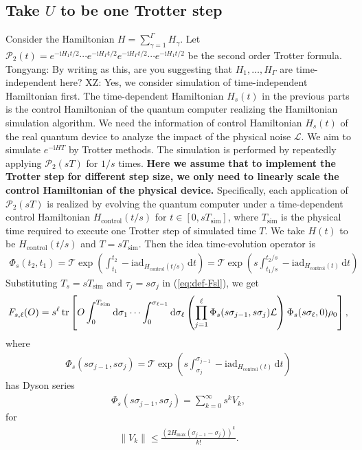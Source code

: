 \documentclass[11pt]{article}
\newcommand{\eq}[1]{(\ref{eq:#1})}
\renewcommand{\i}{\mathrm{i}}
\renewcommand{\d}{\mathrm{d}}
\renewcommand{\L}{\mathcal{L}}
\newcommand{\ad}{\mathrm{ad}}
\newcommand{\T}{\mathcal{T}}
\renewcommand{\P}{\mathcal{P}}
\newcommand{\simu}{\mathrm{sim}}
\newcommand{\Hc}{H_{\mathrm{control}}}
\newcommand{\xz}[1]{{\color{cyan} XZ: #1}}
\newcommand{\tyl}[1]{{\color{blue} Tongyang: #1}}
\begin{document}
\subsection{Take $U$ to be one Trotter step}
Consider the Hamiltonian $H = \sum_{\gamma=1}^{\Gamma} H_{\gamma}$. Let $\P_2(t)=e^{-\i H_1 t/2}\cdots e^{-\i H_{\Gamma} t/2} e^{-\i H_{\Gamma} t/2} \cdots e^{-\i H_1 t/2}$ be the second order Trotter formula. \tyl{By writing as this, are you suggesting that $H_{1},\ldots,H_{\Gamma}$ are time-independent here?} \xz{Yes, we consider simulation of time-independent Hamiltonian first. The time-dependent Hamiltonian $H_s(t)$ in the previous parts is the control Hamiltonian of the quantum computer realizing the Hamiltonian simulation algorithm. We need the information of control Hamiltonian $H_s(t)$ of the real quantum device to analyze the impact of the physical noise $\L$. } We aim to simulate $e^{-\i H T}$ by Trotter methods. The simulation is performed by repeatedly applying $\P_2(sT)$ for $1/s$ times. \textbf{Here we assume that to implement the Trotter step for different step size, we only need to linearly scale the control Hamiltonian of the physical device.} Specifically, each application of $\P_2(sT)$ is realized by evolving the quantum computer under a time-dependent control Hamiltonian $\Hc(t/s)$ for $t\in [0, sT_{\simu}]$, where $T_{\simu}$ is the physical time required to execute one Trotter step of simulated time $T$. We take $H(t)$ to be $\Hc(t/s)$ and $T = s T_{\simu}$. Then the idea time-evolution operator is 
\begin{align*}
    \Phi_s(t_2,t_1)=\T \exp(\int_{t_1}^{t_2} -\i\ad_{\Hc(t/s)}\,\d t) = \T \exp(s\int_{t_1/s}^{t_2/s} -\i\ad_{\Hc(t)}\,\d t) 
\end{align*} 
Substituting $T_s = sT_{\simu}$ and $\tau_j=s\sigma_j$ in \eq{def-Fsl}, we get \begin{align*}
    F_{s,\ell}(O)=s^\ell \tr\left[O \int_{0}^{T_{\simu}} \d\sigma_1 \cdots \int_{0}^{\sigma_{\ell-1}} \d\sigma_{\ell} \left( \prod_{j=1}^{\ell} \Phi_s(s\sigma_{j-1}, s\sigma_j) \L \right) \Phi_s(s\sigma_\ell, 0) \rho_0 \right],
\end{align*}
where \begin{align*}
    \Phi_s(s\sigma_{j-1}, s\sigma_j) = \T \exp(s\int_{\sigma_{j}}^{\sigma_{j-1}} -\i\ad_{\Hc(t)}\,\d t)
\end{align*}
has Dyson series \begin{align*}
    \Phi_s(s\sigma_{j-1}, s\sigma_j)=\sum_{k=0}^{\infty} s^k V_k,
\end{align*}
for \begin{align*}
    \left\|V_k\right\| \leq \frac{\left(2 H_{\max }\left(\sigma_{j-1}-\sigma_j\right)\right)^k}{k!}.
\end{align*}


\end{document}
